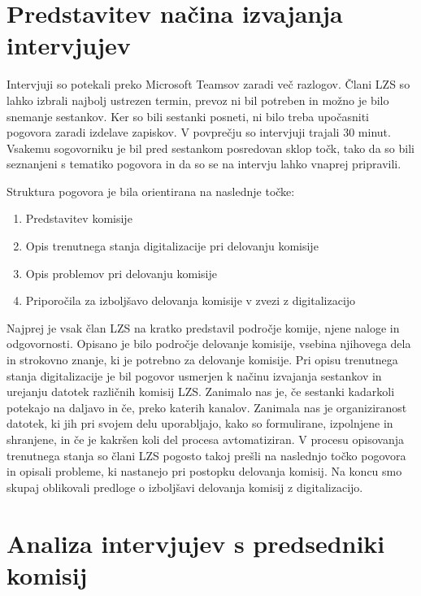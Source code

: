 \documentclass[a4paper,12pt,openright]{book}
\begin{document}
\section{Predstavitev načina izvajanja intervjujev}

Intervjuji so potekali preko Microsoft Teamsov zaradi več razlogov. 
Člani LZS so lahko izbrali najbolj ustrezen termin, prevoz ni bil potreben in možno je bilo snemanje sestankov.
Ker so bili sestanki posneti, ni bilo treba upočasniti pogovora zaradi izdelave zapiskov.
V povprečju so intervjuji trajali 30 minut.
Vsakemu sogovorniku je bil pred sestankom posredovan sklop točk, tako da so bili seznanjeni s tematiko pogovora in da so se na intervju lahko vnaprej pripravili. 

Struktura pogovora je bila orientirana na naslednje točke:
\begin{enumerate}
    \item Predstavitev komisije
    \item Opis trenutnega stanja digitalizacije pri delovanju komisije
    \item Opis problemov pri delovanju komisije
    \item Priporočila za izboljšavo delovanja komisije v zvezi z digitalizacijo
\end{enumerate}


Najprej je vsak član LZS na kratko predstavil področje komije, njene naloge in odgovornosti. 
Opisano je bilo področje delovanje komisije, vsebina njihovega dela in strokovno znanje, ki je potrebno za delovanje komisije. 
Pri opisu trenutnega stanja digitalizacije je bil pogovor usmerjen k načinu izvajanja sestankov in urejanju datotek različnih komisij LZS. 
Zanimalo nas je, če sestanki kadarkoli potekajo na daljavo in če, preko katerih kanalov. 
Zanimala nas je organiziranost datotek, ki jih pri svojem delu uporabljajo, kako so formulirane, izpolnjene in shranjene, in če je kakršen koli del procesa avtomatiziran.
V procesu opisovanja trenutnega stanja so člani LZS pogosto takoj prešli na naslednjo točko pogovora in opisali probleme, ki nastanejo pri postopku delovanja komisij. 
Na koncu smo skupaj oblikovali predloge o izboljšavi delovanja komisij z digitalizacijo. 

\section{Analiza intervjujev s predsedniki komisij}
\end{document}
